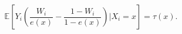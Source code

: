 
\[\mathbb{E}\left[Y_i \left( \frac{W_i}{e(x)}-\frac{1-W_i}{1-e(x)}\right)| X_i =x\right] = \tau(x).\]
